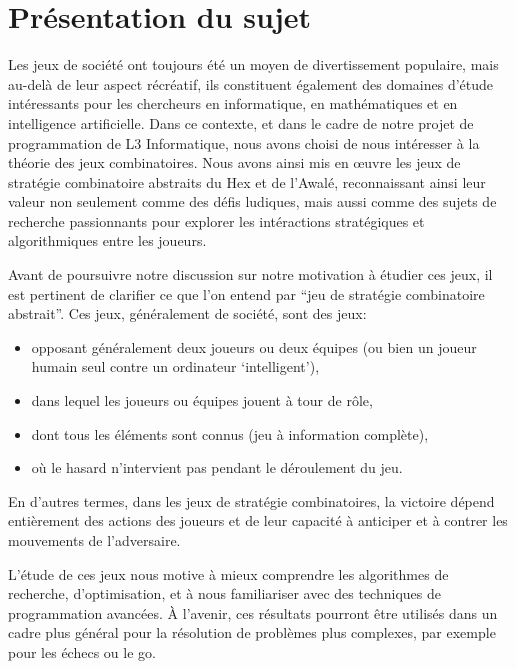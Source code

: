 \section{Présentation du sujet}
Les jeux de société ont toujours été un moyen de divertissement populaire, mais au-delà 
de leur aspect récréatif, ils constituent également des domaines d'étude intéressants pour les 
chercheurs en informatique, en mathématiques et en intelligence artificielle. 
Dans ce contexte, et dans le cadre de notre projet de programmation de L3 Informatique, 
nous avons choisi de nous intéresser à la théorie des jeux combinatoires. Nous avons ainsi mis 
en œuvre les jeux de stratégie combinatoire abstraits du Hex et de l'Awalé, reconnaissant ainsi 
leur valeur non seulement comme des défis ludiques, mais aussi comme des sujets de recherche 
passionnants pour explorer les intéractions stratégiques et algorithmiques entre les joueurs.

Avant de poursuivre notre discussion sur notre motivation à étudier ces jeux, il est pertinent
de clarifier ce que l'on entend par ``jeu de stratégie combinatoire abstrait''. Ces jeux, généralement de société, sont des jeux:
\begin{itemize}
	\item opposant généralement deux joueurs ou deux équipes (ou bien un joueur humain seul 
	contre un ordinateur `intelligent'),
	\item dans lequel les joueurs ou équipes jouent à tour de rôle,
	\item dont tous les éléments sont connus (jeu à information complète),
	\item où le hasard n'intervient pas pendant le déroulement du jeu.
\end{itemize}
En d'autres termes, dans les jeux de stratégie combinatoires, la victoire dépend entièrement 
des actions des joueurs et de leur capacité à anticiper et à contrer les mouvements de l'adversaire. 


L'étude de ces jeux nous motive à mieux comprendre les algorithmes de 
recherche, d'optimisation, et à nous familiariser avec des techniques de 
programmation avancées. À l'avenir, ces résultats pourront être utilisés dans
un cadre plus général pour la résolution de problèmes plus complexes, par exemple
pour les échecs ou le go. 


